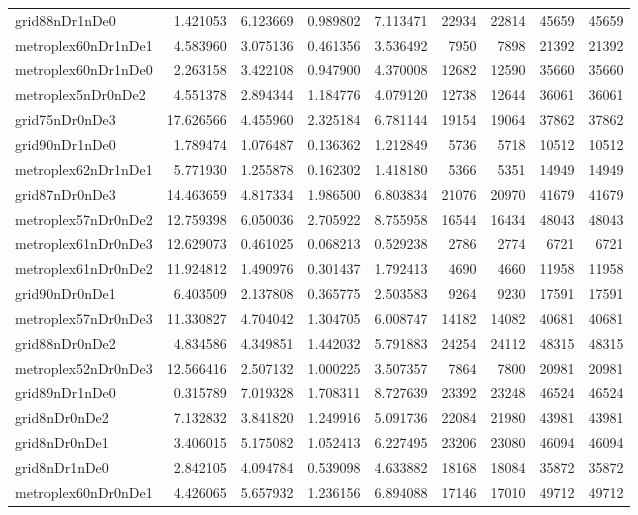 \begin{longtable}{|l|r|r|r|r|r|r|r|r|}
grid88nDr1nDe0 & 1.421053 & 6.123669 & 0.989802 & 7.113471 & 22934 & 22814 & 45659 & 45659 \\
metroplex60nDr1nDe1 & 4.583960 & 3.075136 & 0.461356 & 3.536492 & 7950 & 7898 & 21392 & 21392 \\
metroplex60nDr1nDe0 & 2.263158 & 3.422108 & 0.947900 & 4.370008 & 12682 & 12590 & 35660 & 35660 \\
metroplex5nDr0nDe2 & 4.551378 & 2.894344 & 1.184776 & 4.079120 & 12738 & 12644 & 36061 & 36061 \\
grid75nDr0nDe3 & 17.626566 & 4.455960 & 2.325184 & 6.781144 & 19154 & 19064 & 37862 & 37862 \\
grid90nDr1nDe0 & 1.789474 & 1.076487 & 0.136362 & 1.212849 & 5736 & 5718 & 10512 & 10512 \\
metroplex62nDr1nDe1 & 5.771930 & 1.255878 & 0.162302 & 1.418180 & 5366 & 5351 & 14949 & 14949 \\
grid87nDr0nDe3 & 14.463659 & 4.817334 & 1.986500 & 6.803834 & 21076 & 20970 & 41679 & 41679 \\
metroplex57nDr0nDe2 & 12.759398 & 6.050036 & 2.705922 & 8.755958 & 16544 & 16434 & 48043 & 48043 \\
metroplex61nDr0nDe3 & 12.629073 & 0.461025 & 0.068213 & 0.529238 & 2786 & 2774 & 6721 & 6721 \\
metroplex61nDr0nDe2 & 11.924812 & 1.490976 & 0.301437 & 1.792413 & 4690 & 4660 & 11958 & 11958 \\
grid90nDr0nDe1 & 6.403509 & 2.137808 & 0.365775 & 2.503583 & 9264 & 9230 & 17591 & 17591 \\
metroplex57nDr0nDe3 & 11.330827 & 4.704042 & 1.304705 & 6.008747 & 14182 & 14082 & 40681 & 40681 \\
grid88nDr0nDe2 & 4.834586 & 4.349851 & 1.442032 & 5.791883 & 24254 & 24112 & 48315 & 48315 \\
metroplex52nDr0nDe3 & 12.566416 & 2.507132 & 1.000225 & 3.507357 & 7864 & 7800 & 20981 & 20981 \\
grid89nDr1nDe0 & 0.315789 & 7.019328 & 1.708311 & 8.727639 & 23392 & 23248 & 46524 & 46524 \\
grid8nDr0nDe2 & 7.132832 & 3.841820 & 1.249916 & 5.091736 & 22084 & 21980 & 43981 & 43981 \\
grid8nDr0nDe1 & 3.406015 & 5.175082 & 1.052413 & 6.227495 & 23206 & 23080 & 46094 & 46094 \\
grid8nDr1nDe0 & 2.842105 & 4.094784 & 0.539098 & 4.633882 & 18168 & 18084 & 35872 & 35872 \\
metroplex60nDr0nDe1 & 4.426065 & 5.657932 & 1.236156 & 6.894088 & 17146 & 17010 & 49712 & 49712 \\

\end{longtable}
